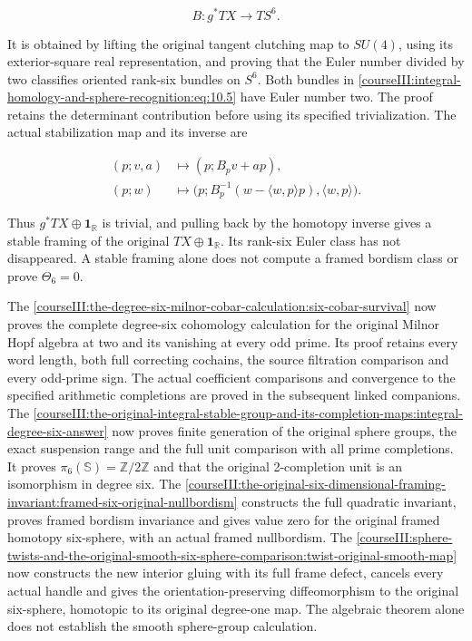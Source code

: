 \begin{equation}
B:g^*TX\longrightarrow TS^6.
\label{courseIII:integral-homology-and-sphere-recognition:eq:10.5}
\end{equation}

It is obtained by lifting the original tangent clutching map to \(SU(4)\), using its exterior-square real representation, and proving that the Euler number divided by two classifies oriented rank-six bundles on \(S^6\). Both bundles in \eqref{courseIII:integral-homology-and-sphere-recognition:eq:10.5} have Euler number two. The proof retains the determinant contribution before using its specified trivialization. The actual stabilization map and its inverse are

\begin{equation}
\begin{aligned}
(p;v,a)&\longmapsto(p;B_pv+ap),\\
(p;w)&\longmapsto
\bigl(p;B_p^{-1}(w-\langle w,p\rangle p),\langle w,p\rangle\bigr).
\end{aligned}
\label{courseIII:integral-homology-and-sphere-recognition:eq:10.6}
\end{equation}

Thus \(g^*TX\oplus\mathbf1_{\mathbb R}\) is trivial, and pulling back by the homotopy inverse gives a stable framing of the original \(TX\oplus\mathbf1_{\mathbb R}\). Its rank-six Euler class has not disappeared. A stable framing alone does not compute a framed bordism class or prove \(\Theta_6=0\).

The \cref{courseIII:the-degree-six-milnor-cobar-calculation:six-cobar-survival} now proves the complete degree-six cohomology calculation for the original Milnor Hopf algebra at two and its vanishing at every odd prime. Its proof retains every word length, both full correcting cochains, the source filtration comparison and every odd-prime sign. The actual coefficient comparisons and convergence to the specified arithmetic completions are proved in the subsequent linked companions. The \cref{courseIII:the-original-integral-stable-group-and-its-completion-maps:integral-degree-six-answer} now proves finite generation of the original sphere groups, the exact suspension range and the full unit comparison with all prime completions. It proves \(\pi_6(\mathbb S)=\mathbb Z/2\mathbb Z\) and that the original 2-completion unit is an isomorphism in degree six. The \cref{courseIII:the-original-six-dimensional-framing-invariant:framed-six-original-nullbordism} constructs the full quadratic invariant, proves framed bordism invariance and gives value zero for the original framed homotopy six-sphere, with an actual framed nullbordism. The \cref{courseIII:sphere-twists-and-the-original-smooth-six-sphere-comparison:twist-original-smooth-map} now constructs the new interior gluing with its full frame defect, cancels every actual handle and gives the orientation-preserving diffeomorphism to the original six-sphere, homotopic to its original degree-one map. The algebraic theorem alone does not establish the smooth sphere-group calculation.

